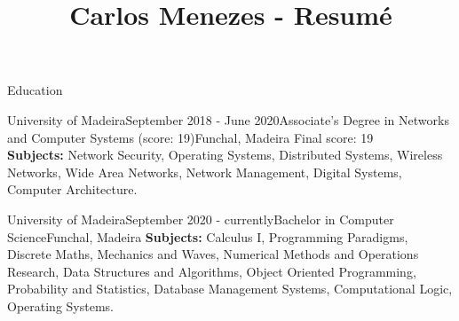 \documentclass{resume} %
\begin{document}
\title{Carlos Menezes - Resumé}

\begin{rSection}{Education}

\begin{rSubsection}{University of Madeira}{September 2018 - June 2020}{Associate's Degree in Networks and Computer Systems (score: 19)}{Funchal, Madeira}
\vspace{-.15cm}
Final score: 19 \\
\textbf{Subjects:} Network Security, Operating Systems, Distributed Systems, Wireless Networks, Wide Area Networks, Network Management, Digital Systems, Computer Architecture.
\item[]
\end{rSubsection}

\vspace{-.2cm}

\begin{rSubsection}{University of Madeira}{September 2020 - currently}{Bachelor in Computer Science}{Funchal, Madeira}
\vspace{-.15cm}
\textbf{Subjects:} Calculus I, Programming Paradigms, Discrete Maths, Mechanics and Waves, Numerical Methods and Operations Research, Data Structures and Algorithms, Object Oriented Programming, Probability and Statistics, Database Management Systems, Computational Logic, Operating Systems.
\item[]
\end{rSubsection}

\end{rSection}

\end{document}
